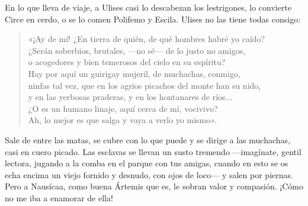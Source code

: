 \documentclass[11pt,a4paper]{article}
\begin{document}
En lo que lleva de viaje, a Ulises casi lo descabezan los lestrigones, lo convierte Circe en cerdo, o se lo comen Polifemo y Escila. Ulises no las tiene todas consigo:

\begin{verse}
«¡Ay de mí! ¿En tierra de quién, de qué hombres habré yo caído?\\
¿Serán soberbios, brutales, ---no sé--- de lo justo no amigos,\\
o acogedores y bien temerosos del cielo en su espíritu?\\
Hay por aquí un guirigay mujeril, de muchachas, conmigo,\\
ninfas tal vez, que en los agrios picachos del monte han su nido,\\
y en las yerbosas praderas, y en los hontanares de ríos...\\
¿O es un humano linaje, aquí cerca de mí, vocivivo?\\
Ah, lo mejor es que salga y vaya a verlo yo mismo».
\end{verse}

Sale de entre las matas, se cubre con lo que puede y se dirige a las muchachas, casi en cuero picado. Las esclavas se llevan un susto tremendo ---imagínate, gentil lectora, jugando a la comba en el parque con tus amigas, cuando en esto se os echa encima un viejo fornido y desnudo, con ojos de loco--- y salen por piernas. Pero a Nausícaa, como buena Ártemis que es, le sobran valor y compasión. ¡Cómo no me iba a enamorar de ella!
\end{document}
